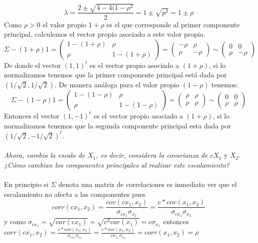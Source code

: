 \documentclass[paper=letter, fontsize=11pt]{scrartcl}
\numberwithin{equation}{section} %
\numberwithin{figure}{section} %
\numberwithin{table}{section} %
\begin{document}
\begin{enumerate}
\[
\lambda= \frac{2\pm \sqrt{4-4(1-\rho^2}}{2} = 1 \pm \sqrt{p^{2}} = 1 \pm \rho 
\]
Como $\rho>0$ el valor propio $1+\rho$ es el que corresponde al primer componente principal, calculemos el vector propio asociado a este valor propio.
\[
\Sigma - (1+\rho)1 = \begin{pmatrix}
					1- (1+\rho) & \rho \\
                    \rho & 1- (1+\rho)
                    \end{pmatrix}
                    = \begin{pmatrix}
					-\rho & \rho \\
                    \rho & -\rho
                    \end{pmatrix} \sim 
                    \begin{pmatrix}
					0 & 0 \\
                    \rho & -\rho
                    \end{pmatrix}
\]
De donde el vector $(1,1)^t$ es el vector propio asociado a $(1+\rho)$, si lo normalizamos tenemos que la primer componente principal está dada por $(1/ \sqrt{2}, 1/ \sqrt{2})$.
De manera análoga para el valor propio $(1-\rho)$ tenemos:\\
\[
\Sigma - (1-\rho)1 = \begin{pmatrix}
					1- (1-\rho) & \rho \\
                    \rho & 1- (1-\rho)
                    \end{pmatrix}
                    = \begin{pmatrix}
					\rho & \rho \\
                    \rho & \rho
                    \end{pmatrix} \sim 
                    \begin{pmatrix}
					0 & 0 \\
                    \rho & \rho
                    \end{pmatrix}
\]
Entonces el vector $(1,-1)^t$ es el vector propio asociado a $(1+\rho)$, si lo normalizamos tenemos que la segunda componente principal esta dada por $(1/ \sqrt{2}, -1/ \sqrt{2})^t$.\\\\

\textit{Ahora, cambia la escala de $X_1$, es decir, considera la covarianza de} $cX_1$ y $X_2$. \textit{¿Cómo cambian los componentes principales al realizar este escalamiento?}\\\\
En principio si $\Sigma $ denota una matriz de correlaciones es inmediato ver que el escalamiento no afecta a las componentes pues 
\[corr(cx_1,x_2) = \frac{cov(cx_1,x_2)}{\sigma_{cx_1}\sigma_{x_2}}= \frac{c*cov(x_1,x_2)}{\sigma_{cx_1}\sigma_{x_2}}\]
y como $\sigma_{cx_1}= \sqrt{var(cx_1)}=\sqrt{c^2var(x_1)}= c \sigma_{x_1}$
entonces $corr(cx_1,x_2)= \frac{c*cov(x_1,x_2)}{\sigma_{cx_1}\sigma_{x_2}} = \frac{c*cov(x_1,x_2)}{c\sigma_{x_1}\sigma_{x_2}}=corr(x_1,x_2)=\rho$\\


\end{enumerate}
\end{document}
